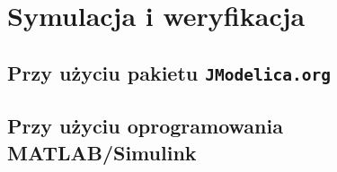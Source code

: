 \section{Symulacja i weryfikacja}
\label{sec:sym-wer}


\subsection{Przy użyciu pakietu \texttt{JModelica.org}}
\label{sub:sym-wer-jmodelica}


\subsection{Przy użyciu oprogramowania MATLAB/Simulink}
\label{sub:sym-wer-matlab}
